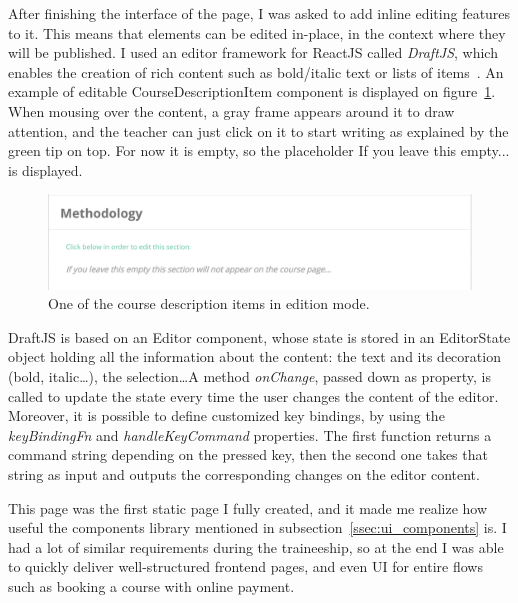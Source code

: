 After finishing the interface of the page, I was asked to add inline editing features to it. This means that elements can be edited in-place, in the context where they will be published. I used an editor framework for ReactJS called \textit{DraftJS}, which enables the creation of rich content such as bold/italic text or lists of items~\cite{draftJS}. An example of editable CourseDescriptionItem component is displayed on {\sc figure}~\ref{fig:courseEdit}. When mousing over the content, a gray frame appears around it to draw attention, and the teacher can just click on it to start writing as explained by the green tip on top. For now it is empty, so the placeholder \guillemotleft{} If you leave this empty... \guillemotright{} is displayed.

\begin{figure}[H]
    \centering
    \includegraphics[scale=0.4]{figure/courseEdit.png}
    \caption{One of the course description items in edition mode.}
    \label{fig:courseEdit}
\end{figure}

DraftJS is based on an \guillemotleft{} Editor \guillemotright{} component, whose state is stored in an \guillemotleft{} EditorState \guillemotright{} object holding all the information about the content: the text and its decoration (bold, italic\ldots), the selection\ldots A method \textit{onChange}, passed down as property, is called to update the state every time the user changes the content of the editor. Moreover, it is possible to define customized key bindings, by using the \textit{keyBindingFn} and \textit{handleKeyCommand} properties. The first function returns a command string depending on the pressed key, then the second one takes that string as input and outputs the corresponding changes on the editor content.

This page was the first static page I fully created, and it made me realize how useful the components library mentioned in {\sc subsection}~\ref{ssec:ui_components} is. I had a lot of similar requirements during the traineeship, so at the end I was able to quickly deliver well-structured frontend pages, and even UI for entire flows such as booking a course with online payment.

